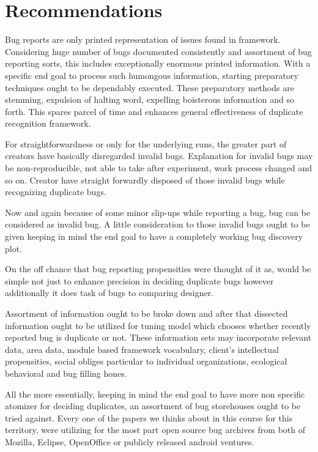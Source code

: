 \documentclass[]{sig-alternate-05-2015}
\begin{document}
\section{Recommendations}
Bug reports are only printed representation of issues found in framework. Considering huge number of bugs documented consistently and assortment of bug reporting sorts, this includes exceptionally enormous printed information. With a specific end goal to process such humongous information, starting preparatory techniques ought to be dependably executed. These preparatory methods are stemming, expulsion of halting word, expelling boisterous information and so forth. This spares parcel of time and enhances general effectiveness of duplicate recognition framework. \newline

For straightforwardness or only for the underlying runs, the greater part of creators have basically disregarded invalid bugs. Explanation for invalid bugs may be non-reproducible, not able to take after experiment, work process changed and so on. Creator have straight forwardly disposed of those invalid bugs while recognizing duplicate bugs. \newline

Now and again because of some minor slip-ups while reporting a bug, bug can be considered as invalid bug. A little consideration to those invalid bugs ought to be given keeping in mind the end goal to have a completely working bug discovery plot. \newline

On the off chance that bug reporting propensities were thought of it as, would be simple not just to enhance precision in deciding duplicate bugs however additionally it does task of bugs to comparing designer. \newline


Assortment of information ought to be broke down and after that dissected information ought to be utilized for tuning model which chooses whether recently reported bug is duplicate or not. These information sets may incorporate relevant data, area data, module based framework vocabulary, client's intellectual propensities, social obliges particular to individual organizations, ecological behavioral and bug filling hones. \newline

All the more essentially, keeping in mind the end goal to have more non specific atomizer for deciding duplicates, an assortment of bug storehouses ought to be tried against. Every one of the papers we thinks about in this course for this territory, were utilizing for the most part open source bug archives from both of Mozilla, Eclipse, OpenOffice or publicly released android ventures. \newline
\end{document}
